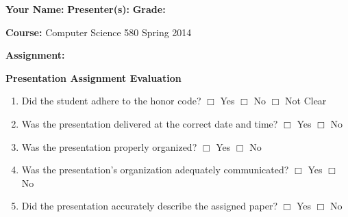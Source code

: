 \documentclass[letterpaper, 10pt]{article} %
\begin{document}
\pagestyle{empty}

\vspace*{-1.2in}

\noindent
{\bf Your Name:} \hspace*{2in} {\bf Presenter(s):} \hspace*{2in} {\bf Grade:} 

\vspace*{.1in}

\noindent
{\bf Course:} Computer Science 580 Spring 2014

\vspace*{.1in}

\noindent
{\bf Assignment:} 

\vspace*{.1in}

\large{

\begin{center}{\bf Presentation Assignment Evaluation} \end{center}

\begin{enumerate}

\setlength{\itemsep}{1pt}

\item Did the student adhere to the honor code? \hspace*{.05in}  $\Box$ Yes
  \hspace*{.05in} $\Box$ No \hspace*{.05in}  $\Box$ Not Clear

\item Was the presentation delivered at the correct date and
  time? \hspace*{.05in} $\Box$ Yes
  \hspace*{.05in} $\Box$ No

\item Was the presentation properly organized? \hspace*{.05in} $\Box$ Yes
  \hspace*{.05in} $\Box$ No 

\item Was the presentation's organization adequately
  communicated? \hspace*{.05in} $\Box$ Yes
  \hspace*{.05in} $\Box$ No

\item Did the presentation accurately describe the
  assigned paper? \hspace*{.05in} $\Box$ Yes
  \hspace*{.05in} $\Box$ No


\end{enumerate}}
\end{document}
